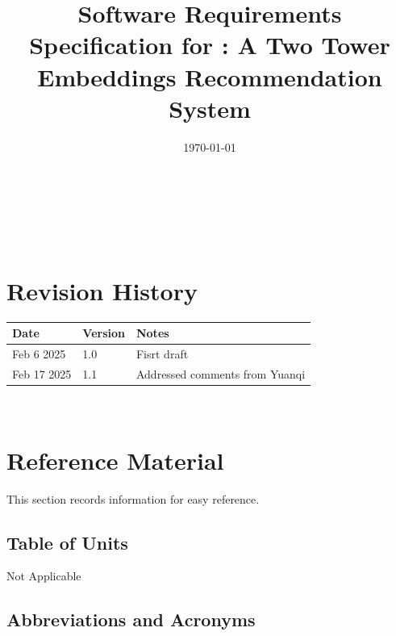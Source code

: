 \documentclass[12pt]{article}
\begin{document}
\title{Software Requirements Specification for \progname: A Two Tower Embeddings Recommendation System} 
\author{\authname}
\date{\today}
	
\maketitle

~\newpage


\tableofcontents

~\newpage

\section*{Revision History}

\begin{tabularx}{\textwidth}{p{3cm}p{2cm}X}
\toprule {\bf Date} & {\bf Version} & {\bf Notes}\\
\midrule
Feb 6 2025 & 1.0 & Fisrt draft\\
Feb 17 2025 & 1.1 & Addressed comments from Yuanqi\\
\bottomrule
\end{tabularx}


~\newpage

\section{Reference Material}

This section records information for easy reference.

\subsection{Table of Units}

Not Applicable

\subsection{Abbreviations and Acronyms}
\end{document}
